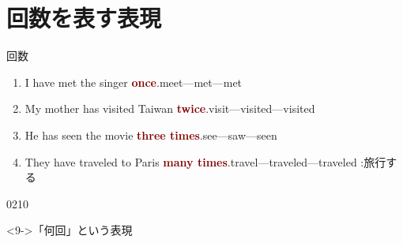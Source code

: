 \documentclass[aspectratio=169,xcolor={dvipsnames,table}]{beamer}
\newcommand{\myaudio}[1]{\href{#1}{\faVolumeUp}}
\begin{document}
\section{回数を表す表現}
\begin{frame}[plain]{回数}


 \begin{enumerate}
  \item<1-> I have met the singer \textcolor{Maroon}{\bfseries once}.\hfill{\scriptsize meet---met---met}\\
  \item<3-> My mother has visited Taiwan \textcolor{Maroon}{\bfseries twice}.\hfill{\scriptsize  visit---visited---visited}\\
  \item<5-> He has seen the movie \textcolor{Maroon}{\bfseries three times}.\hfill{\scriptsize  see---saw---seen}\\
  \item<7-> They have traveled to Paris \textcolor{Maroon}{\bfseries many times}.\hfill{\scriptsize  travel---traveled---traveled :旅行する}\\
%
\end{enumerate}

\vspace{-20pt}

\hfill{\tiny 0210}\,{\scriptsize \myaudio{./audio/013_have_pp_keiken_03.mp3}}

\begin{block}<9->{「何回」という表現}
\small


\end{block}
\end{frame}
\end{document}
